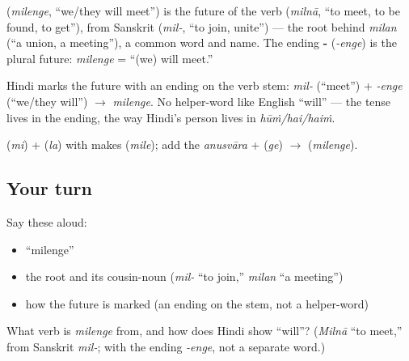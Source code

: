 \begin{cousinweb}
\textbf{} (\emph{milenge}, \textquotedblleft{}we/they will meet\textquotedblright{}) is the future of the verb \textbf{} (\emph{milnā}, \textquotedblleft{}to meet, to be found, to get\textquotedblright{}), from Sanskrit \textbf{} (\emph{mil-}, \textquotedblleft{}to join, unite\textquotedblright{}) — the root behind \emph{milan} (\textquotedblleft{}a union, a meeting\textquotedblright{}), a common word and name. The ending \textbf{-} (\emph{-enge}) is the plural future: \emph{milenge} = \textquotedblleft{}(we) will meet.\textquotedblright{}
\end{cousinweb}

\begin{grammarlens}[title={Grammar Lens: how Hindi builds the future}]
Hindi marks the future with an ending on the verb stem: \emph{mil-} (\textquotedblleft{}meet\textquotedblright{}) + \emph{-enge} (\textquotedblleft{}we/they will\textquotedblright{}) $\to$ \emph{milenge}. No helper-word like English \textquotedblleft{}will\textquotedblright{} — the tense lives in the ending, the way Hindi's person lives in \emph{hūṁ/hai/haiṁ}.
\end{grammarlens}

\begin{sounds}
 (\emph{mi}) +  (\emph{la}) with  makes  (\emph{mile}); add the \emph{anusvāra} +  (\emph{ge}) $\to$  (\emph{milenge}).
\end{sounds}

\subsection*{Your turn}
Say these aloud:

\begin{itemize}
\raggedright
  \item \textquotedblleft{}milenge\textquotedblright{}
  \item the root and its cousin-noun (\emph{mil-} \textquotedblleft{}to join,\textquotedblright{} \emph{milan} \textquotedblleft{}a meeting\textquotedblright{})
  \item how the future is marked (an ending on the stem, not a helper-word)
\end{itemize}

\begin{tcolorbox}[breakable,colback=teal!4,colframe=teal!35!black,title={Before you move on}]
What verb is \emph{milenge} from, and how does Hindi show \textquotedblleft{}will\textquotedblright{}? (\emph{Milnā} \textquotedblleft{}to meet,\textquotedblright{} from Sanskrit \emph{mil-}; with the ending \emph{-enge}, not a separate word.)
\end{tcolorbox}

